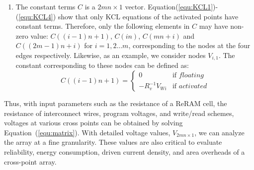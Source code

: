 \begin{enumerate}
  \item The constant terms $C$ is a $2mn{\times}1$ vector. Equation(\ref{equ:KCL1})-(\ref{equ:KCL4}) show that only KCL equations of the activated points have constant terms. Therefore, only the following elements in $C$ may have non-zero value: $C((i-1)n+1)$, $C(in)$, $C(mn+i)$ and $C((2m-1)n+i)$ for $i=1,2...m$, corresponding to the nodes at the four edges respectively. Likewise, as an example, we consider nodes $V_{i,1}$. The constant corresponding to these nodes can be defined as:
    \begin{equation}
    C((i-1)n+1) = \left\{
    \begin{array}{ll}
    0   & \text{if } floating\\
    -R_v^{-1}V_{Wi}& \text{if } activated
    \end{array} \right.
    \end{equation}
\end{enumerate}

Thus, with input parameters such as the resistance of a ReRAM cell, the resistance of interconnect wires, program voltages, and write/read schemes, voltages at various cross points can be obtained by solving Equation~(\ref{equ:matrix}).
With detailed voltage values, $V_{2mn{\times}1}$, we can analyze the array at a fine granularity. These values are also critical to evaluate reliability, energy consumption, driven current density, and area overheads of a cross-point array.
